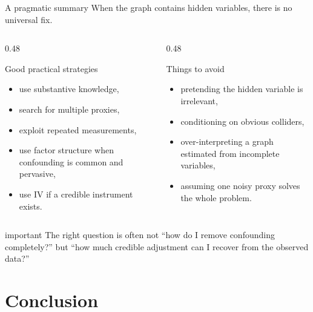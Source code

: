 \documentclass[dvipsnames,aspectratio=169,handout]{beamer}
\begin{document}
\begin{frame}{A pragmatic summary}
When the graph contains hidden variables, there is no universal fix.

\begin{columns}[T]
\begin{column}{0.48\textwidth}
\begin{block}{Good practical strategies}
\begin{itemize}
    \item use substantive knowledge,
    \item search for multiple proxies,
    \item exploit repeated measurements,
    \item use factor structure when confounding is common and pervasive,
    \item use IV if a credible instrument exists.
\end{itemize}
\end{block}
\end{column}
\begin{column}{0.48\textwidth}
\begin{block}{Things to avoid}
\begin{itemize}
    \item pretending the hidden variable is irrelevant,
    \item conditioning on obvious colliders,
    \item over-interpreting a graph estimated from incomplete variables,
    \item assuming one noisy proxy solves the whole problem.
\end{itemize}
\end{block}
\end{column}
\end{columns}

\begin{beamercolorbox}[wd=\textwidth,sep=8pt,center,rounded=true,shadow=true]{important}
The right question is often not “how do I remove confounding completely?” but “how much credible adjustment can I recover from the observed data?”
\end{beamercolorbox}
\end{frame}


\section{Conclusion}
\end{document}
